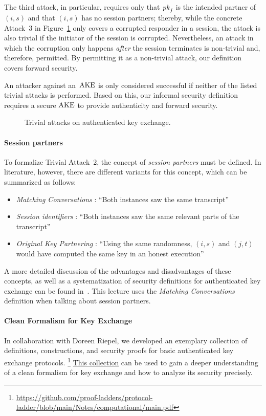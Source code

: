 The third attack, in particular, requires only that $\mathit{pk}_j$ is the intended partner of $(i,s)$ and that $(i,s)$ has no session partners;
thereby, while the concrete Attack~3 in Figure~\ref{fig:ake:trivial} only covers a corrupted responder in a session, the attack is also trivial if the initiator of the session is corrupted.
Nevertheless, an attack in which the corruption only happens \emph{after} the session terminates is non-trivial and, therefore, permitted.
By permitting it as a non-trivial attack, our definition covers forward security.

An attacker against an~$\mathrm{AKE}$ is only considered successful if neither of the listed trivial attacks is performed.
Based on this, our informal security definition requires a secure $\mathrm{AKE}$ to provide authenticity and forward security.

\begin{figure}[!ht]
    \centering
    
    \caption{Trivial attacks on authenticated key exchange.}
    \label{fig:ake:trivial}
\end{figure}

\paragraph{Session partners}
To formalize Trivial Attack~2, the concept of \emph{session partners} must be defined. 
In literature, however, there are different variants for this concept, which can be summarized as follows:
\begin{itemize}
    \item \emph{Matching Conversations} \cite{C:BelRog93}: ``Both instances saw the same transcript''
    \item \emph{Session identifiers} \cite{STOC:BelRog95,EPRINT:BCJSW24}: ``Both instances saw the same relevant parts of the transcript''
    \item \emph{Original Key Partnering} \cite{EPRINT:LiSch17}: ``Using the same randomness, $(i,s)$ and $(j,t)$ would have computed the same key in an honest execution''
\end{itemize}
A more detailed discussion of the advantages and disadvantages of these concepts, as well as a systematization of security definitions for authenticated key exchange can be found in~\cite{RSA:PRSS21,EPRINT:BCJSW24}.
This lecture uses the \emph{Matching Conversations} definition when talking about session partners.

\paragraph{Clean Formalism for Key Exchange}
In collaboration with Doreen Riepel, we developed an exemplary collection of definitions, constructions, and security proofs for basic authenticated key exchange protocols.%
\footnote{\url{https://github.com/proof-ladders/protocol-ladder/blob/main/Notes/computational/main.pdf}}
\href{https://github.com/proof-ladders/protocol-ladder/blob/main/Notes/computational/main.pdf}{This collection} can be used to gain a deeper understanding of a clean formalism for key exchange and how to analyze its security precisely.


